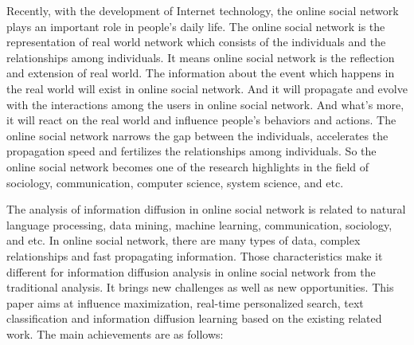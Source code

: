 \begin{eabstract}
Recently, with the development of Internet technology, the online social network plays an important role in people's daily life. The online social network is the representation of real world network which consists of the individuals and the relationships among individuals. It means online social network is the reflection and extension of real world. The information about the event which happens in the real world will exist in online social network. And it will propagate and evolve with the interactions among the users in online social network. And what's more, it will react on the real world and influence people's behaviors and actions. The online social network narrows the gap between the individuals, accelerates the propagation speed and fertilizes the relationships among individuals. So the online social network becomes one of the research highlights in the field of sociology, communication, computer science, system science, and etc.

The analysis of information diffusion in online social network is related to natural language processing, data mining, machine learning, communication, sociology, and etc. In online social network, there are many types of data, complex relationships and fast propagating information. Those characteristics make it different for information diffusion analysis in online social network from the traditional analysis. It brings new challenges as well as new opportunities. This paper aims at influence maximization, real-time personalized search, text classification and information diffusion learning based on the existing related work. The main achievements are as follows:


\end{eabstract}
